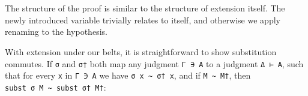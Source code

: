 \begin{fence}
\begin{code}
\AgdaOperator{\AgdaDatatype{\textasciitilde{}}}\AgdaSpace{}%
\AgdaSpace{}%
\AgdaSpace{}%
\AgdaSymbol{)}\<%
\\
\>[0]\AgdaSpace{}%
\AgdaSpace{}%
%
\>[16]\AgdaSymbol{=}%
\>[19]\<%
\\
\>[0]\AgdaSpace{}%
\AgdaSpace{}%
\AgdaSymbol{(}\AgdaSpace{}%
\AgdaSymbol{)}%
\>[16]\AgdaSymbol{=}%
\>[19]\AgdaSpace{}%
\AgdaSpace{}%
\AgdaSymbol{(}\AgdaSpace{}%
\AgdaSymbol{)}\<%
\end{code}
\end{fence}

The structure of the proof is similar to the structure of extension
itself. The newly introduced variable trivially relates to itself, and
otherwise we apply renaming to the hypothesis.

With extension under our belts, it is straightforward to show
substitution commutes. If \texttt{σ} and \texttt{σ†} both map any
judgment \texttt{Γ\ ∋\ A} to a judgment \texttt{Δ\ ⊢\ A}, such that for
every \texttt{x} in \texttt{Γ\ ∋\ A} we have
\texttt{σ\ x\ \textasciitilde{}\ σ†\ x}, and if
\texttt{M\ \textasciitilde{}\ M†}, then
\texttt{subst\ σ\ M\ \textasciitilde{}\ subst\ σ†\ M†}:

